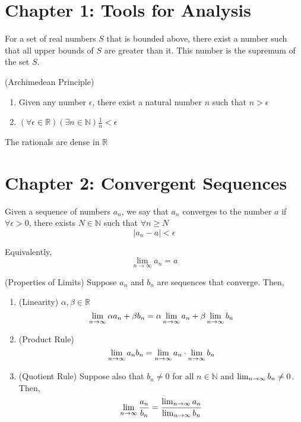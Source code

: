 \documentclass{article}
\begin{document}
\section{Chapter 1: Tools for Analysis}
\begin{definition}
    For a set of real numbers $S$ that is bounded above, there exist a number such that all
    upper bounds of $S$ are greater than it. This number is the supremum of the set $S$.
\end{definition}
\begin{theorem}
   (Archimedean Principle) 
   
   \begin{enumerate}
       \item Given any number $\epsilon$, there exist a natural number $n$ such that $n>\epsilon$
       \item $(\forall\epsilon\in \mathbb{R}) (\exists n\in \mathbb{N}) \frac{1}{n} < \epsilon$
   \end{enumerate}
\end{theorem}
\begin{theorem}
    The rationals are dense in $\mathbb{R}$
\end{theorem}

\section{Chapter 2: Convergent Sequences}
\begin{definition}
    Given a sequence of numbers ${a_n}$, we say that ${a_n}$ converges to the number $a$
    if $\forall \epsilon>0$, there exists $N\in \mathbb{N}$ such that $\forall n \ge N$
    \[|a_n - a| < \epsilon\]
\end{definition}
Equivalently,
\[ \lim_{n \to \infty} a_n = a \]

\begin{theorem}
    (Properties of Limits) Suppose ${a_n}$ and ${b_n}$ are sequences that converge. Then,
    \begin{enumerate}
        \item (Linearity) $\alpha,\beta \in \mathbb{R}$
        \[ \lim_{n \to \infty} \alpha a_n + \beta b_n = \alpha\lim_{n \to \infty} a_n + \beta\lim_{n \to \infty} b_n\]
        \item (Product Rule)
        \[ \lim_{n \to \infty} a_nb_n = \lim_{n \to \infty} a_n \cdot \lim_{n \to \infty} b_n \]
        \item (Quotient Rule) Suppose also that $b_n \neq 0$ for all $n\in \mathbb{N}$ and
        $\lim_{n \to \infty} b_n \neq 0$. Then,
        \[ \lim_{n \to \infty} \frac{a_n}{b_n} = \frac{\lim_{n \to \infty} a_n}{\lim_{n \to \infty} b_n}\]
    \end{enumerate}
\end{theorem}
\end{document}
